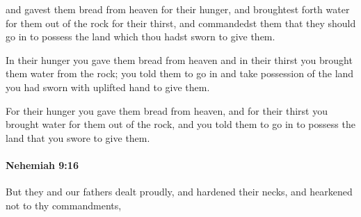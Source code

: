 			\begin{versebox}
					\item[BHS] 
					\item[LXX] 
					\item[ASV] and gavest them bread from heaven for their hunger, and broughtest forth water for them out of the rock for their thirst, and commandedst them that they should go in to possess the land which thou hadst sworn to give them.
					\item[NIV] In their hunger you gave them bread from heaven and in their thirst you brought them water from the rock; you told them to go in and take possession of the land you had sworn with uplifted hand to give them.
					\item[NRSV] For their hunger you gave them bread from heaven, and for their thirst you brought water for them out of the rock, and you told them to go in to possess the land that you swore to give them.
			\end{versebox}

		\paragraph{Nehemiah 9:16} %
			\label{NEHEMIAH-9-16}

			But they and our fathers dealt proudly, and hardened their necks, and hearkened not to thy commandments,


